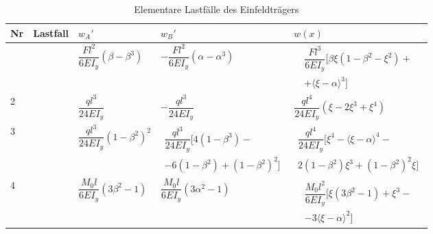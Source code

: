 %
\begin{table}
	\centering
	\begin{tabular}[c]{>{\centering\arraybackslash}m{0.5cm} >{\centering\arraybackslash}m{5cm} >{\centering\arraybackslash}m{5cm}>{\centering\arraybackslash}m{5cm} >{\centering\arraybackslash}m{5cm}}
		\toprule
		Nr & Lastfall & $w_A'$ & $w_B'$ & $w(x)$\\\midrule
		1
		&  & 
		$\dfrac{Fl^2}{6EI_y}(\beta-\beta^3)$ & 
		$-\dfrac{Fl^2}{6EI_y}(\alpha-\alpha^3)$ & 
		\begin{minipage}{5cm}
			\begin{multline}
				\dfrac{Fl^3}{6EI_y}\Big[\beta\xi(1-\beta^2-\xi^2)+ \\
				+\big\langle \xi-\alpha\big\rangle^3\Big]
			\end{multline}
		\end{minipage}
		\\\midrule
		2 &  & 
		$\dfrac{ql^3}{24EI_y}$ & 
		$-\dfrac{ql^3}{24EI_y}$ & 
		$\dfrac{ql^4}{24EI_y}\left(\xi-2\xi^3+\xi^4\right)$
		\\\midrule
		3 &  & 
		$\dfrac{ql^3}{24EI_y}(1-\beta^2)^2$ &
		\begin{minipage}{5cm}
			\begin{multline}
				\dfrac{ql^3}{24EI_y}\Big[4(1-\beta^3)- \\- 6(1-\beta^2)+(1-\beta^2)^2\Big]
			\end{multline}
		\end{minipage}
 		& 
		\begin{minipage}{5cm}
			\begin{multline}
			\dfrac{ql^4}{24EI_y}\Big[\xi^4 -\big\langle\xi-\alpha\big\rangle^4- \\ 2(1-\beta^2)\xi^3+(1-\beta^2)^2\xi\Big]
			\end{multline}
		\end{minipage}
		\\\midrule
		4 &  & 
		$\dfrac{M_0l}{6EI_y}(3\beta^2-1)$ & 
		$\dfrac{M_0l}{6EI_y}(3\alpha^2-1)$ & 
		\begin{minipage}{5cm}
			\begin{multline}
			\dfrac{M_0l^2}{6EI_y}\Big[\xi(3\beta^2-1)+\xi^3- \\-3\big\langle\xi-\alpha\big\rangle^2\Big]
			\end{multline}
		\end{minipage}
		\\\bottomrule
	\end{tabular}
	\caption{Elementare Lastfälle des Einfeldträgers}
	\label{tab:2-1}
\end{table}

